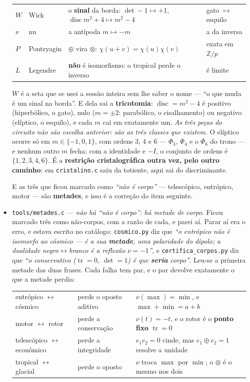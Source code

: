 \documentclass[11pt]{article}
\newcommand{\code}[1]{\texttt{\small #1}}
\newcommand{\Z}{\mathbb Z}
\theoremstyle{plain}
\theoremstyle{remark}
\newcommand{\tr}{\operatorname{tr}}
\newcommand{\disc}{\operatorname{disc}}
\begin{document}
\begin{itemize}
\begin{center}\begin{tabular}{llll}
$W$ & Wick & o \textbf{sinal} da borda: $\det -1 \mapsto +1$, $\disc m^2{+}4 \mapsto m^2{-}4$ & gato $\mapsto$ esquilo \\
$\nu$ & nu & a antípoda $m \mapsto -m$ & a da inversa \\
$P$ & Pontryagin & $\oplus$ vira $\otimes$: $\chi(u{+}v) = \chi(u)\chi(v)$ & exata em $\Z/p$ \\
$L$ & Legendre & \textbf{não} é isomorfismo: o tropical perde o inverso & é limite \\
\end{tabular}\end{center}

$W$ é a seta que se usei a sessão inteira sem lhe saber o nome --- ``o que muda é um sinal na
borda''. E dela sai a \textbf{tricotomia}: $\disc = m^2-4$ é positivo (hiperbólico, o gato), nulo
($m = \pm2$: parabólico, o cisalhamento) ou negativo (elíptico, o esquilo), e cada $m$ cai em
exatamente um. \emph{As três peças do circuito não são escolha anterior: são as três classes que
existem.} O elíptico ocorre só em $m \in \{-1,0,1\}$, com ordens $3$, $4$ e $6$ --- $\Phi_3$,
$\Phi_4$ e o $\Phi_6$ do trono --- e nenhum outro $m$ fecha; com a identidade e $-I$, o conjunto
de ordens é $\{1,2,3,4,6\}$. É a \textbf{restrição cristalográfica outra vez, pelo outro
caminho}: em \code{cristalino.c} saiu da totiente, aqui sai do discriminante.

E as três que ficou marcado como \emph{``não é corpo''} --- telescópico, entrópico, motor --- são
\textbf{metades}, e isso é a correção do item seguinte.
\item \code{tools/metades.c} --- \emph{não há ``não é corpo'': há metade de corpo}. Ficou marcado
três como não-corpos, com a razão de cada, e parei aí. Parar aí era o erro, e estava escrito no
catálogo: \code{cosmico.py} diz que \emph{``o entrópico não é isomorfo ao cósmico --- é a sua
\textbf{metade}, uma polaridade do dipolo; a dualidade negro$\leftrightarrow$branco é a reflexão
$\nu=-1$''}, e \code{certifica\_corpos.py} diz que \emph{``o conservativo ($\tr = 0$, $\det = 1$)
é que \textbf{seria} corpo''}. Leu-se a primeira metade das duas frases. Cada falha tem par, e o
par devolve exatamente o que a metade perdia:

\begin{center}\begin{tabular}{lll}
entrópico $\leftrightarrow$ cósmico & perde o oposto aditivo & $\nu(\max) = \min$, e $\max+\min = a+b$ \\
motor $\leftrightarrow$ rotor & perde a conservação & $\nu(t) = -t$, e o rotor é o \textbf{ponto fixo} $\tr = 0$ \\
telescópico $\leftrightarrow$ econômico & perde a integridade & $e_1 e_2 = 0$ cinde, mas $e_1 \oplus e_2 = 1$ resolve a unidade \\
tropical $\leftrightarrow$ glacial & perde o oposto & $\nu$ troca $\max$ por $\min$; o $\otimes$ é o mesmo nos dois \\
\end{tabular}\end{center}


\end{itemize}
\end{document}
